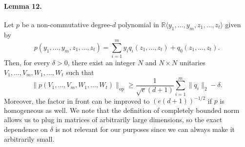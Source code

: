 \documentclass[10pt,a4paper]{article}
\begin{document}
\paragraph{Lemma 12.}
Let $p$ be a non-commutative degree-$d$ polynomial in $\mathbb R\langle y_1,\ldots,y_m,z_1,\ldots,z_t\rangle$ given by
\[p(y_1,\ldots,y_m,z_1,\ldots,z_t)=\sum_{i=1}^my_iq_i(z_1,\ldots,z_t)+q_0(z_1,\ldots,z_t).\]
Then, for every $\delta>0$, there exist an integer $N$ and $N\times N$ unitaries $V_1,\ldots,V_m,W_1,\ldots,W_t$ such that
\[\|p(V_1,\ldots,V_m,W_1,\ldots,W_t)\|_{\mathrm{op}}\geq\frac1{\sqrt e(d+1)}\sum_{i=1}^m\|q_i\|_2-\delta.\]
Moreover, the factor in front can be improved to $(e(d+1))^{-1/2}$ if $p$ is homogeneous as well.
We note that the definition of completely bounded norm allows us to plug in matrices of arbitrarily large dimensions, so the exact dependence on $\delta$ is not relevant for our purposes since we can always make it arbitrarily small.
\end{document}
